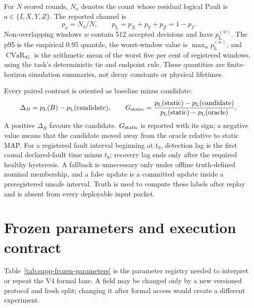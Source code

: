 \documentclass[11pt]{article}
\newcommand{\pL}{p_{\mathrm L}}
\begin{document}
For $N$ scored rounds, $N_a$ denotes the count whose residual logical Pauli is
$a\in\{I,X,Y,Z\}$.  The reported channel is
\begin{equation}
 p_a=N_a/N,\qquad \pL=p_X+p_Y+p_Z=1-p_I.
 \label{eq:supp-pauli-ler}
\end{equation}
Non-overlapping windows $w$ contain 512 accepted decisions and have
$\pL^{(w)}$.  The p95 is the empirical 0.95 quantile, the worst-window value is
$\max_w\pL^{(w)}$, and $\operatorname{CVaR}_{95}$ is the arithmetic mean of the
worst five per cent of registered windows, using the task's deterministic tie
and endpoint rule.  These quantities are finite-horizon simulation summaries,
not decay constants or physical lifetimes.

Every paired contrast is oriented as baseline minus candidate:
\begin{equation}
 \Delta_B=\pL(B)-\pL(\mathrm{candidate}),\qquad
 G_{\rm static}=
 \frac{\pL(\mathrm{static})-\pL(\mathrm{candidate})}
      {\pL(\mathrm{static})-\pL(\mathrm{oracle})}.
 \label{eq:supp-contrasts}
\end{equation}
A positive $\Delta_B$ favours the candidate.  $G_{\rm static}$ is reported
with its sign; a negative value means that the candidate moved away from the
oracle relative to static MAP.  For a registered fault interval beginning at
$t_0$, detection lag is the first causal declared-fault time minus $t_0$;
recovery lag ends only after the required healthy hysteresis.  A fallback is
unnecessary only under offline truth-defined nominal membership, and a false
update is a committed update inside a preregistered unsafe interval.  Truth is
used to compute these labels after replay and is absent from every deployable
input packet.

\section{Frozen parameters and execution contract}

Table~\ref{tab:supp-frozen-parameters} is the parameter registry needed to
interpret or repeat the V4 formal lane.  A field may be changed only by a new
versioned protocol and fresh split; changing it after formal access would
create a different experiment.
\end{document}
